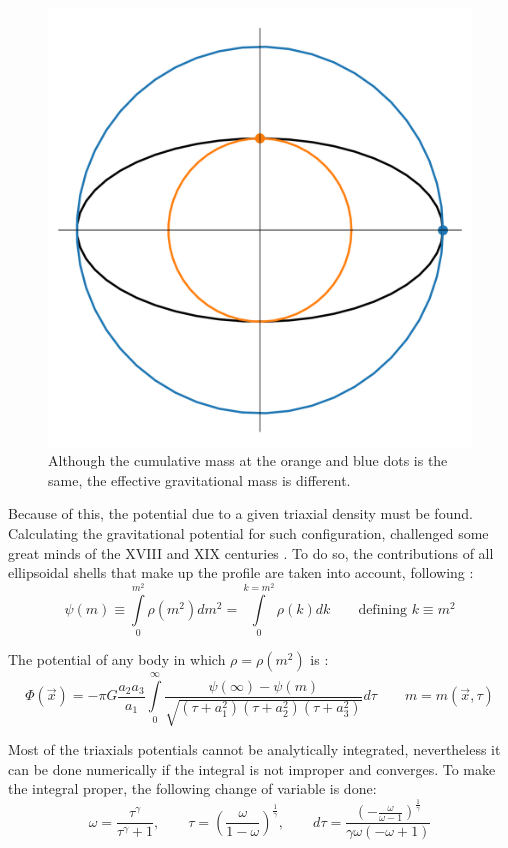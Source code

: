 	\begin{figure}[h]
		\centering
		\includegraphics[width = 0.5\linewidth]{"../Files/Week 7/triaxial_mass_issue"}
		\caption{Although the cumulative mass at the orange and blue dots is the same, the effective gravitational mass is different.}
		\label{fig: triaxial_mass_issue}
	\end{figure}
	
	Because of this, the potential due to a given triaxial density must be found. Calculating the gravitational potential for such configuration, challenged some great minds of the XVIII and XIX centuries \cite{binney2011galactic}. To do so, the contributions of all ellipsoidal shells that make up the profile are taken into account, following \citeauthor{binney2011galactic}:
	\begin{equation}
		\psi(m) \equiv \int\limits_{0}^{m^2} \rho(m^2)dm^2 = \int\limits_{0}^{k = m^2} \rho(k)dk \qquad \text{defining $k \equiv m^2$} 
	\end{equation}
	
	The potential of any body in which $\rho = \rho(m^2)$ is \cite{binney2011galactic}:
	\begin{equation}\label{eq: generalPotential}
		\Phi(\vec{x}) = -\pi G \dfrac{a_2a_3}{a_1}\int\limits_{0}^{\infty}\dfrac{\psi(\infty) - \psi(m)}{\sqrt{(\tau + a_1^2)(\tau + a_2^2)(\tau + a_3^2)}}d\tau \qquad m = m(\vec{x}, \tau)
	\end{equation}
	
	Most of the triaxials potentials cannot be analytically integrated, nevertheless it can be done numerically if the integral is not improper and converges. To make the integral proper, the following change of variable is done:
	\begin{equation}
		\omega = \dfrac{\tau^\gamma}{\tau^\gamma + 1}, \qquad \tau = \left(\frac{\omega}{1-\omega}\right)^{\frac{1}{\gamma}}, \qquad d\tau = \dfrac{\left(- \frac{\omega}{\omega - 1}\right)^{\frac{1}{\gamma}}}{\gamma \omega \left(- \omega + 1\right)}
	\end{equation} 
	
